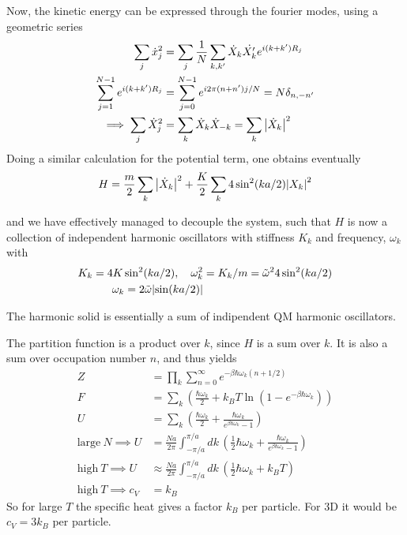 \documentclass[a4paper, english, 12pt]{article}
\newcommand{\closed}[1]{\left( #1 \right)}
\begin{document}
\begin{multicols*}{2}
Now, the kinetic energy can be expressed through the fourier modes, using a geometric series 
\begin{align*}
    \sum_j \dot{x}_j^2 &= \sum_j \frac{1}{N}\sum_{k,k'}\dot{X}_k \dot{X_k'} e^{i(k+k')R_j} \\ 
    \sum_{j=1}^{N-1} e^{i(k+k')R_j} &= \sum_{j=0}^{N-1}e^{i2\pi(n+n') j/N} = N\delta_{n,-n'} \\ 
    \implies \sum_j \dot{X}_j^2 &= \sum_k \dot{X}_k \dot{X}_{-k} = \sum_k \abs{\dot{X}_k}^2 
\end{align*}
Doing a similar calculation for the potential term, one obtains eventually 
\begin{align*}
    H = \frac{m}{2} \sum_k \abs{\dot{X}_k}^2 + \frac{K}{2} \sum_k 4\sin^2(ka/2) \abs{X_k}^2
\end{align*}

and we have effectively managed to decouple the system, such that $H$ is now a collection of independent harmonic oscillators with stiffness $K_k$ and frequency, $\omega_k$ with 
\begin{align*}
    K_k = 4K \sin^2(ka/2),\quad \omega_k^2 &= K_k/m = \tilde{\omega}^2 4\sin^2(ka/2) \\
    \omega_k = 2 \tilde{\omega}\abs{\sin(ka/2)}
\end{align*}

The harmonic solid is essentially a sum of indipendent QM harmonic oscillators. 

The partition function is a product over $k$, since $H$ is a sum over $k$. It is also a sum over occupation number $n$, and thus yields 
\begin{align*}
    Z &= \prod_k \sum_{n=0}^\infty e^{-\beta \hbar \omega_k (n+1/2)} \\ 
    F &= \sum_k \closed{\frac{\hbar \omega_k}{2} + k_B T \ln\closed{1-e^{-\beta \hbar \omega_k}} } \\
    U &= \sum_k \closed{\frac{\hbar \omega_k}{2} + \frac{\hbar \omega_k}{e^{\beta \hbar \omega_k} - 1} } \\ 
    \text{large}\: N \implies U &= \frac{Na}{2\pi} \int_{-\pi/a}^{\pi/a} dk\, \closed{\frac{1}{2}\hbar \omega_k + \frac{\hbar \omega_k}{e^{\beta \hbar \omega_k} - 1} } \\ 
    \text{high}\: T \implies U &\approx \frac{Na}{2\pi} \int_{-\pi/a}^{\pi/a} dk\, \closed{\frac{1}{2}\hbar \omega_k + k_B T} \\ 
    \text{high}\: T \implies c_V &= k_B
\end{align*}
So for large $T$ the specific heat gives a factor $k_B$ per particle. For 3D it would be $c_V=3k_B$ per particle. 


\end{multicols*}
\end{document}
